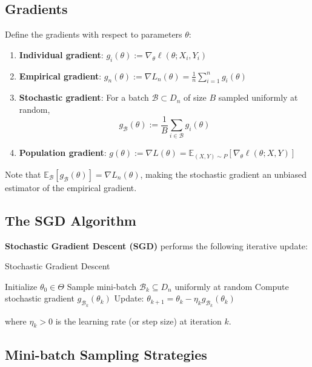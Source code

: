 \documentclass[11pt]{article}
\begin{document}
\subsection{Gradients}

Define the gradients with respect to parameters $\theta$:

\begin{enumerate}
    \item \textbf{Individual gradient}: $g_i(\theta) := \nabla_\theta \ell(\theta; X_i, Y_i)$
    \item \textbf{Empirical gradient}: $g_n(\theta) := \nabla L_n(\theta) = \frac{1}{n} \sum_{i=1}^n g_i(\theta)$
    \item \textbf{Stochastic gradient}: For a batch $\mathcal{B} \subset D_n$ of size $B$ sampled uniformly at random,
    $$g_{\mathcal{B}}(\theta) := \frac{1}{B} \sum_{i \in \mathcal{B}} g_i(\theta)$$
    \item \textbf{Population gradient}: $g(\theta) := \nabla L(\theta) = \mathbb{E}_{(X,Y) \sim P}[\nabla_\theta \ell(\theta; X, Y)]$
\end{enumerate}

Note that $\mathbb{E}_{\mathcal{B}}[g_{\mathcal{B}}(\theta)] = \nabla L_n(\theta)$, making the stochastic gradient an unbiased estimator of the empirical gradient.

\subsection{The SGD Algorithm}

\textbf{Stochastic Gradient Descent (SGD)} performs the following iterative update:

\begin{algorithm}
\caption{Stochastic Gradient Descent}
\begin{algorithmic}[1]
\State Initialize $\theta_0 \in \Theta$
    \State Sample mini-batch $\mathcal{B}_k \subseteq D_n$ uniformly at random
    \State Compute stochastic gradient $g_{\mathcal{B}_k}(\theta_k)$
    \State Update: $\theta_{k+1} = \theta_k - \eta_k g_{\mathcal{B}_k}(\theta_k)$
\EndFor
\end{algorithmic}
\end{algorithm}

where $\eta_k > 0$ is the learning rate (or step size) at iteration $k$.

\subsection{Mini-batch Sampling Strategies}
\end{document}
